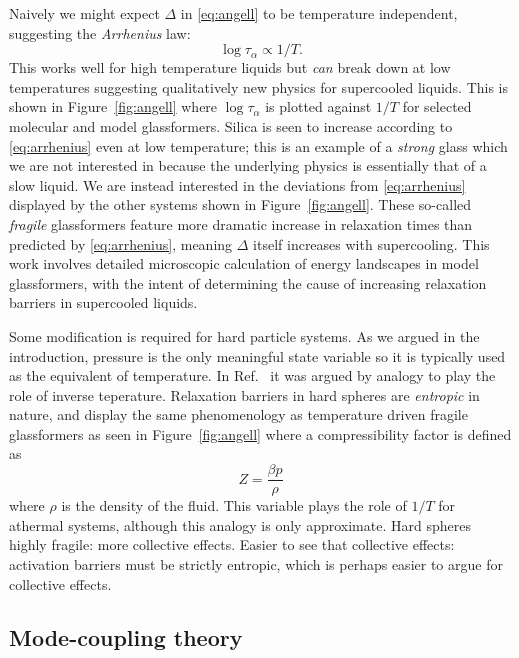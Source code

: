 Naively we might expect $\Delta$ in \eqref{eq:angell} to be temperature independent, suggesting the \emph{Arrhenius} law:
\begin{equation}\label{eq:arrhenius}
  \log{\tau_\alpha} \propto 1/T.
\end{equation}
This works well for high temperature liquids but \emph{can} break down at low temperatures suggesting qualitatively new physics for supercooled liquids.
This is shown in Figure~\ref{fig:angell} where $\log{\tau_\alpha}$ is plotted against $1/T$ for selected molecular and model glassformers.
Silica is seen to increase according to \eqref{eq:arrhenius} even at low temperature; this is an example of a \emph{strong} glass which we are not interested in because the underlying physics is essentially that of a slow liquid.
We are instead interested in the deviations from \eqref{eq:arrhenius} displayed by the other systems shown in Figure~\ref{fig:angell}.
These so-called \emph{fragile} glassformers feature more dramatic increase in relaxation times than predicted by \eqref{eq:arrhenius}, meaning $\Delta$ itself increases with supercooling.
This work involves detailed microscopic calculation of energy landscapes in model glassformers, with the intent of determining the cause of increasing relaxation barriers in supercooled liquids.

Some modification is required for hard particle systems.
As we argued in the introduction, pressure is the only meaningful state variable so it is typically used as the equivalent of temperature.
In Ref.\ \cite{BerthierPRE2009} it was argued by analogy to play the role of inverse teperature.
Relaxation barriers in hard spheres are \emph{entropic} in nature, and display the same phenomenology as temperature driven fragile glassformers as seen in Figure~\ref{fig:angell} where a compressibility factor is defined as
\begin{equation*}
  Z = \frac{\beta p}{\rho}
\end{equation*}
where $\rho$ is the density of the fluid. This variable plays the role of $1/T$ for athermal systems, although this analogy is only approximate.
Hard spheres highly fragile: more collective effects.
Easier to see that collective effects: activation barriers must be strictly entropic, which is perhaps easier to argue for collective effects.

\subsection{Mode-coupling theory}

